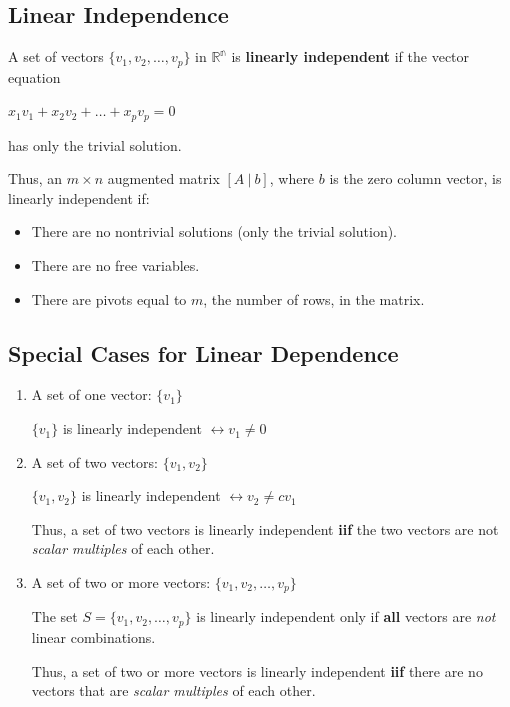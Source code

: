 \documentclass[12pt, letterpaper]{article}
\begin{document}
\subsection*{Linear Independence}

A set of vectors $ \{v_1, v_2, \hdots, v_p \} $ in $ \mathbb{R^n} $
is \textbf{linearly independent} if the vector equation

\medskip
{\centering

  $ x_1v_1 + x_2v_2 + \hdots + x_pv_p = 0 $

}
\medskip

has only the trivial solution.
\bigskip

Thus, an $ m \times n $ augmented matrix $ [A \:|\: b] $, where $ b $
is the zero column vector, is linearly independent if:
\begin{itemize}
  \item There are no nontrivial solutions (only the trivial solution).
  \item There are no free variables.
  \item There are pivots equal to $ m $, the number of rows, in the matrix.
\end{itemize}

\subsection*{Special Cases for Linear Dependence}

\begin{enumerate}
  \item A set of one vector: $ \{ v_1 \} $
    \medskip

    $ \{ v_1 \} $ is linearly independent $ \leftrightarrow v_1 \neq 0 $
  \item A set of two vectors: $ \{ v_1, v_2 \} $
    \medskip

    $ \{v_1, v_2 \} $ is linearly independent $ \leftrightarrow v_2 \neq cv_1 $
    \medskip

    Thus, a set of two vectors is linearly independent \textbf{iif}
    the two vectors are not \textit{scalar multiples} of each other.
  \item A set of two or more vectors: $ \{ v_1, v_2, \hdots, v_p \} $
    \medskip

    The set $ S = \{ v_1, v_2, \hdots, v_p \} $ is linearly
    independent only if \textbf{all} vectors are \textit{not} linear
    combinations.
    \medskip

    Thus, a set of two or more vectors is linearly independent
    \textbf{iif} there are no vectors that are \textit{scalar
    multiples} of each other.
\end{enumerate}
\end{document}
